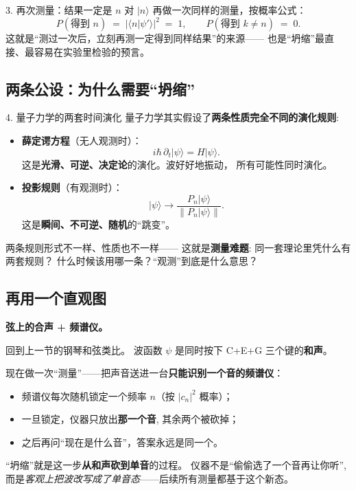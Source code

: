 \documentclass[11pt,a4paper]{ctexart}
\begin{document}
\begin{stepblock}{3. 再次测量：结果一定是 $n$}
对 $\lvert n\rangle$ 再做一次同样的测量，按概率公式：
\[
  P(\text{得到 }n) \;=\; |\langle n|\psi'\rangle|^2 \;=\; 1,
  \qquad
  P(\text{得到 }k\ne n) \;=\; 0.
\]
这就是``测过一次后，立刻再测一定得到同样结果''的来源——
也是``坍缩''最直接、最容易在实验里检验的预言。
\end{stepblock}

\subsection{两条公设：为什么需要``坍缩''}

\begin{stepblock}{4. 量子力学的两套时间演化}
量子力学其实假设了\textbf{两条性质完全不同的演化规则}:
\begin{itemize}
  \item \textbf{薛定谔方程}（无人观测时）：
        \[
          i\hbar\,\partial_t\lvert\psi\rangle = H\lvert\psi\rangle.
        \]
        这是\textbf{光滑、可逆、决定论}的演化。波好好地振动，
        所有可能性同时演化。
  \item \textbf{投影规则}（有观测时）：
        \[
          \lvert\psi\rangle \to \frac{P_n\lvert\psi\rangle}{\|P_n\lvert\psi\rangle\|}.
        \]
        这是\textbf{瞬间、不可逆、随机}的``跳变''。
\end{itemize}

\smallskip
两条规则形式不一样、性质也不一样——
这就是\textbf{测量难题}: 同一套理论里凭什么有两套规则？
什么时候该用哪一条？``观测''到底是什么意思？
\end{stepblock}

\subsection{再用一个直观图}

\begin{lifeblock}
\textbf{弦上的合声 + 频谱仪。}

回到上一节的钢琴和弦类比。
波函数 $\psi$ 是同时按下 C+E+G 三个键的\textbf{和声}。
\smallskip

现在做一次``测量''——把声音送进一台\textbf{只能识别一个音的频谱仪}：
\begin{itemize}
  \item 频谱仪每次随机锁定一个频率 $n$（按 $|c_n|^2$ 概率）；
  \item 一旦锁定，仪器只放出\textbf{那一个音}, 其余两个被砍掉；
  \item 之后再问``现在是什么音''，答案永远是同一个。
\end{itemize}

\smallskip
``坍缩''就是这一步\textbf{从和声砍到单音}的过程。
仪器不是``偷偷选了一个音再让你听'',
而是\emph{客观上把波改写成了单音态}——后续所有测量都基于这个新态。
\end{lifeblock}
\end{document}
